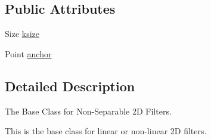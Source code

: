 \subsection*{Public Attributes}
\begin{DoxyCompactItemize}
\item 
Size \hyperlink{classcv_1_1gpu_1_1BaseFilter__GPU_aa5e0771ce60a854ba7b98efc64655a62}{ksize}
\item 
Point \hyperlink{classcv_1_1gpu_1_1BaseFilter__GPU_abc14dff732da4164665c676366a210b3}{anchor}
\end{DoxyCompactItemize}


\subsection{Detailed Description}
The Base Class for Non-\/\-Separable 2\-D Filters.

This is the base class for linear or non-\/linear 2\-D filters. 

